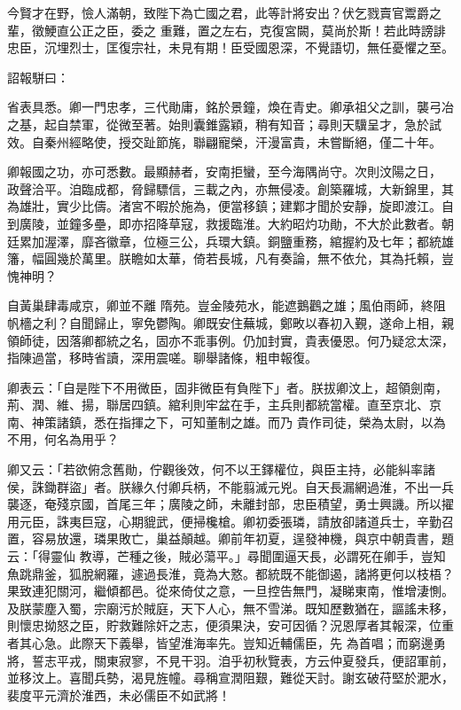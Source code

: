 \begin{pinyinscope}
 今賢才在野，憸人滿朝，致陛下為亡國之君，此等計將安出？伏乞戮賣官鬻爵之輩，徵鯁直公正之臣，委之
 重難，置之左右，克復宮闕，莫尚於斯！若此時謗誹忠臣，沉埋烈士，匡復宗社，未見有期！臣受國恩深，不覺語切，無任憂懼之至。



 詔報駢曰：



 省表具悉。卿一門忠孝，三代勛庸，銘於景鐘，煥在青史。卿承祖父之訓，襲弓冶之基，起自禁軍，從微至著。始則囊錐露穎，稍有知音；尋則天驥呈才，急於試效。自秦州經略使，授交趾節旄，聯翩寵榮，汗漫富貴，未嘗斷絕，僅二十年。



 卿報國之功，亦可悉數。最顯赫者，安南拒蠻，至今海隅尚守。次則汶陽之日，
 政聲洽平。洎臨成都，脅歸驃信，三載之內，亦無侵凌。創築羅城，大新錦里，其為雄壯，實少比儔。渚宮不暇於施為，便當移鎮；建鄴才聞於安靜，旋即渡江。自到廣陵，並鐘多壘，即亦招降草寇，救援臨淮。大約昭灼功勛，不大於此數者。朝廷累加渥澤，靡吝徽章，位極三公，兵環大鎮。銅鹽重務，綰握約及七年；都統雄籓，幅圓幾於萬里。朕瞻如太華，倚若長城，凡有奏論，無不依允，其為托賴，豈愧神明？



 自黃巢肆毒咸京，卿並不離
 隋苑。豈金陵苑水，能遮鵝鸛之雄；風伯雨師，終阻帆檣之利？自聞歸止，寧免鬱陶。卿既安住蕪城，鄭畋以春初入覲，遂命上相，親領師徒，因落卿都統之名，固亦不乖事例。仍加封實，貴表優恩。何乃疑忿太深，指陳過當，移時省讀，深用震嗟。聊舉諸條，粗申報復。



 卿表云：「自是陛下不用微臣，固非微臣有負陛下」者。朕拔卿汶上，超領劍南，荊、潤、維、揚，聯居四鎮。綰利則牢盆在手，主兵則都統當權。直至京北、京南、神策諸鎮，悉在指揮之下，可知董制之雄。而乃
 貴作司徒，榮為太尉，以為不用，何名為用乎？



 卿又云：「若欲俯念舊勛，佇觀後效，何不以王鐸權位，與臣主持，必能糾率諸侯，誅鋤群盜」者。朕緣久付卿兵柄，不能翦滅元兇。自天長漏網過淮，不出一兵襲逐，奄殘京國，首尾三年；廣陵之師，未離封部，忠臣積望，勇士興譏。所以擢用元臣，誅夷巨寇，心期貔武，便掃欃槍。卿初委張璘，請放卻諸道兵士，辛勤召置，容易放還，璘果敗亡，巢益顛越。卿前年初夏，逞發神機，與京中朝貴書，題云：「得靈仙
 教導，芒種之後，賊必蕩平。」尋聞圍逼天長，必謂死在卿手，豈知魚跳鼎釜，狐脫網羅，遽過長淮，竟為大憝。都統既不能御遏，諸將更何以枝梧？果致連犯關河，繼傾都邑。從來倚仗之意，一旦控告無門，凝睇東南，惟增淒惻。及朕蒙塵入蜀，宗廟污於賊庭，天下人心，無不雪涕。既知歷數猶在，謳謠未移，則懷忠拗怒之臣，貯救難除奸之志，便須果決，安可因循？況恩厚者其報深，位重者其心急。此際天下義舉，皆望淮海率先。豈知近輔儒臣，先
 為首唱；而窮邊勇將，誓志平戎，關東寂寥，不見干羽。洎乎初秋覽表，方云仲夏發兵，便詔軍前，並移汶上。喜聞兵勢，渴見旌幢。尋稱宣潤阻艱，難從天討。謝玄破苻堅於淝水，裴度平元濟於淮西，未必儒臣不如武將！




\end{pinyinscope}
